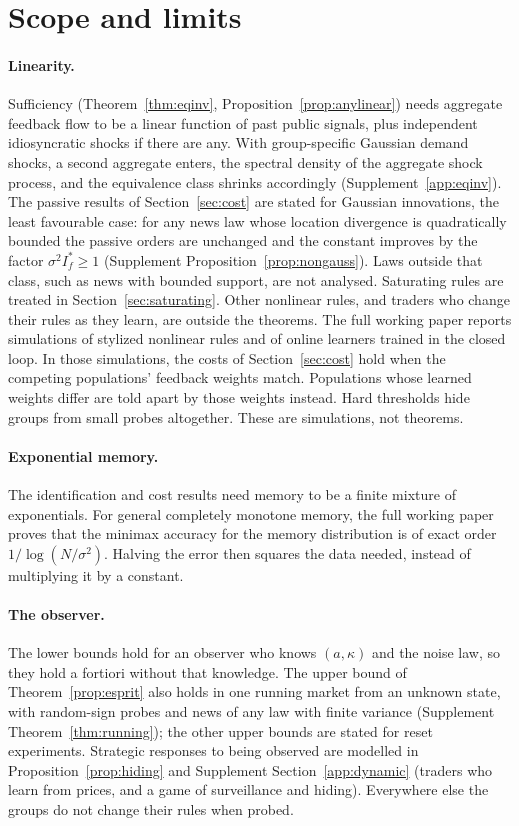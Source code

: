 \documentclass[12pt]{article}
\theoremstyle{definition}
\theoremstyle{remark}
\begin{document}
\section{Scope and limits}\label{sec:scope}

\paragraph{Linearity.} Sufficiency (Theorem~\ref{thm:eqinv}, Proposition~\ref{prop:anylinear}) needs aggregate feedback flow to be a linear function of past public signals, plus independent idiosyncratic shocks if there are any. With group-specific Gaussian demand shocks, a second aggregate enters, the spectral density of the aggregate shock process, and the equivalence class shrinks accordingly (Supplement~\ref{app:eqinv}). The passive results of Section~\ref{sec:cost} are stated for Gaussian innovations, the least favourable case: for any news law whose location divergence is quadratically bounded the passive orders are unchanged and the constant improves by the factor $\sigma^2I^*_f\ge1$ (Supplement Proposition~\ref{prop:nongauss}). Laws outside that class, such as news with bounded support, are not analysed. Saturating rules are treated in Section~\ref{sec:saturating}. Other nonlinear rules, and traders who change their rules as they learn, are outside the theorems. The full working paper reports simulations of stylized nonlinear rules and of online learners trained in the closed loop. In those simulations, the costs of Section~\ref{sec:cost} hold when the competing populations' feedback weights match. Populations whose learned weights differ are told apart by those weights instead. Hard thresholds hide groups from small probes altogether. These are simulations, not theorems.

\paragraph{Exponential memory.} The identification and cost results need memory to be a finite mixture of exponentials. For general completely monotone memory, the full working paper proves that the minimax accuracy for the memory distribution is of exact order $1/\log(N/\sigma^2)$. Halving the error then squares the data needed, instead of multiplying it by a constant.

\paragraph{The observer.} The lower bounds hold for an observer who knows $(a,\kappa)$ and the noise law, so they hold a fortiori without that knowledge. The upper bound of Theorem~\ref{prop:esprit} also holds in one running market from an unknown state, with random-sign probes and news of any law with finite variance (Supplement Theorem~\ref{thm:running}); the other upper bounds are stated for reset experiments. Strategic responses to being observed are modelled in Proposition~\ref{prop:hiding} and Supplement Section~\ref{app:dynamic} (traders who learn from prices, and a game of surveillance and hiding). Everywhere else the groups do not change their rules when probed.
\end{document}
